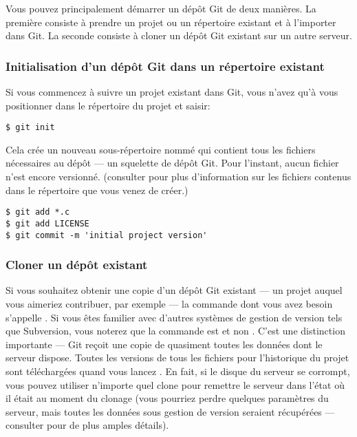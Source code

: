 Vous pouvez principalement démarrer un dépôt Git de deux manières.
La première consiste à prendre un projet ou un répertoire existant et à l'importer dans Git.
La seconde consiste à cloner un dépôt Git existant sur un autre serveur.

\subsubsection{Initialisation d'un dépôt Git dans un répertoire existant}

Si vous commencez à suivre un projet existant dans Git, vous n'avez qu'à vous positionner dans le répertoire du projet et saisir:
\begin{Schunk}
\begin{Verbatim}
$ git init
\end{Verbatim}
\end{Schunk}

Cela crée un nouveau sous-répertoire nommé  qui contient tous les fichiers nécessaires au dépôt --- un squelette de dépôt Git.
Pour l'instant, aucun fichier n'est encore versionné.
(consulter  pour plus d'information sur les fichiers contenus dans le répertoire  que vous venez de créer.)
\begin{Schunk}
\begin{Verbatim}
$ git add *.c
$ git add LICENSE
$ git commit -m 'initial project version'
\end{Verbatim}
\end{Schunk}

\subsubsection{Cloner un dépôt existant}
\label{sec:git:cloning}

Si vous souhaitez obtenir une copie d'un dépôt Git existant --- un projet auquel vous aimeriez contribuer, par exemple --- la commande dont vous avez besoin s'appelle .
Si vous êtes familier avec d'autres systèmes de gestion de version tels que Subversion, vous noterez que la commande est  et non .
C'est une distinction importante --- Git reçoit une copie de quasiment toutes les données dont le serveur dispose.
Toutes les versions de tous les fichiers pour l'historique du projet sont téléchargées quand vous lancez .
En fait, si le disque du serveur se corrompt, vous pouvez utiliser n'importe quel clone pour remettre le serveur dans l'état où il était au moment du clonage (vous pourriez perdre quelques paramètres du serveur, mais toutes les données sous gestion de version seraient récupérées --- consulter  pour de plus amples détails).

